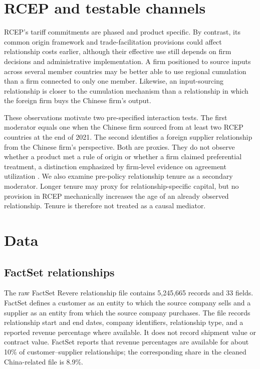 \documentclass[preprint,12pt,authoryear]{elsarticle}
\begin{document}
\section{RCEP and testable channels}

RCEP's tariff commitments are phased and product specific. By contrast, its common origin framework and trade-facilitation provisions could affect relationship costs earlier, although their effective use still depends on firm decisions and administrative implementation. A firm positioned to source inputs across several member countries may be better able to use regional cumulation than a firm connected to only one member. Likewise, an input-sourcing relationship is closer to the cumulation mechanism than a relationship in which the foreign firm buys the Chinese firm's output.

These observations motivate two pre-specified interaction tests. The first moderator equals one when the Chinese firm sourced from at least two RCEP countries at the end of 2021. The second identifies a foreign supplier relationship from the Chinese firm's perspective. Both are proxies. They do not observe whether a product met a rule of origin or whether a firm claimed preferential treatment, a distinction emphasized by firm-level evidence on agreement utilization \citep{hayakawa2023}. We also examine pre-policy relationship tenure as a secondary moderator. Longer tenure may proxy for relationship-specific capital, but no provision in RCEP mechanically increases the age of an already observed relationship. Tenure is therefore not treated as a causal mediator.

\section{Data}

\subsection{FactSet relationships}

The raw FactSet Revere relationship file contains 5,245,665 records and 33 fields. FactSet defines a customer as an entity to which the source company sells and a supplier as an entity from which the source company purchases. The file records relationship start and end dates, company identifiers, relationship type, and a reported revenue percentage where available. It does not record shipment value or contract value. FactSet reports that revenue percentages are available for about 10\% of customer--supplier relationships; the corresponding share in the cleaned China-related file is 8.9\%.
\end{document}

